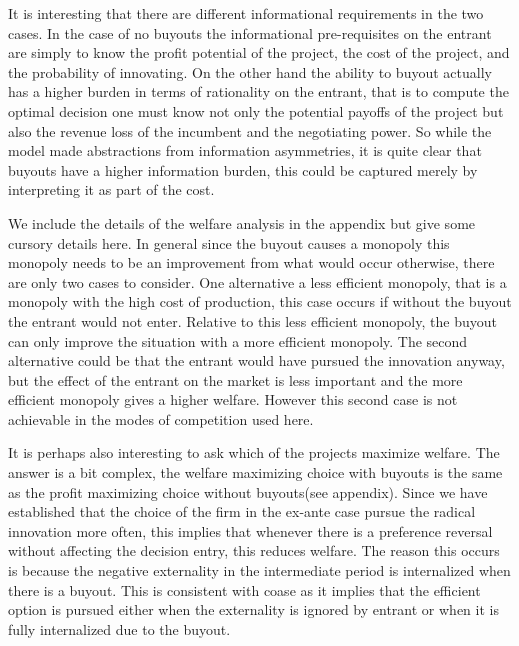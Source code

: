 It is interesting that there are different informational requirements in the two cases. In the case of no buyouts the informational pre-requisites on the entrant are simply to know the profit potential of the project, the cost of the project, and the probability of innovating. On the other hand the ability to buyout actually has a higher burden in terms of rationality on the entrant, that is to compute the optimal decision one must know not only the potential payoffs of the project but also the revenue loss of the incumbent and the negotiating power. So while the model made abstractions from information asymmetries, it is quite clear that buyouts have a higher information burden, this could be captured merely by interpreting it as part of the cost. 

We include the details of the welfare analysis in the appendix but give some cursory details here. In general since the buyout causes a monopoly this monopoly needs to be an improvement from what would occur otherwise, there are only two cases to consider. One alternative a less efficient monopoly, that is a monopoly with the high cost of production, this case occurs if without the buyout the entrant would not enter. Relative to this less efficient monopoly, the buyout can only improve the situation with a more efficient monopoly. The second alternative could be that the entrant would have pursued the innovation anyway, but the effect of the entrant on the market is less important and the more efficient monopoly gives a higher welfare. However this second case is not achievable in the modes of competition used here.

It is perhaps also interesting to ask which of the projects maximize welfare. The answer is a bit complex, the welfare maximizing choice with buyouts is the same as the profit maximizing choice without buyouts(see appendix). Since we have established that the choice of the firm in the ex-ante case pursue the radical innovation more often, this implies that whenever there is a preference reversal without affecting the decision entry, this reduces welfare. The reason this occurs is because the negative externality in the intermediate period is internalized when there is a buyout. This is consistent with coase as it implies that the efficient option is pursued either when the externality is ignored by entrant or when it is fully internalized due to the buyout.

